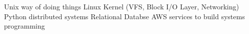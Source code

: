 
Unix way of doing things
Linux Kernel (VFS, Block I/O Layer, Networking)
Python
distributed systems
Relational Databse
AWS services to build systems
programming



